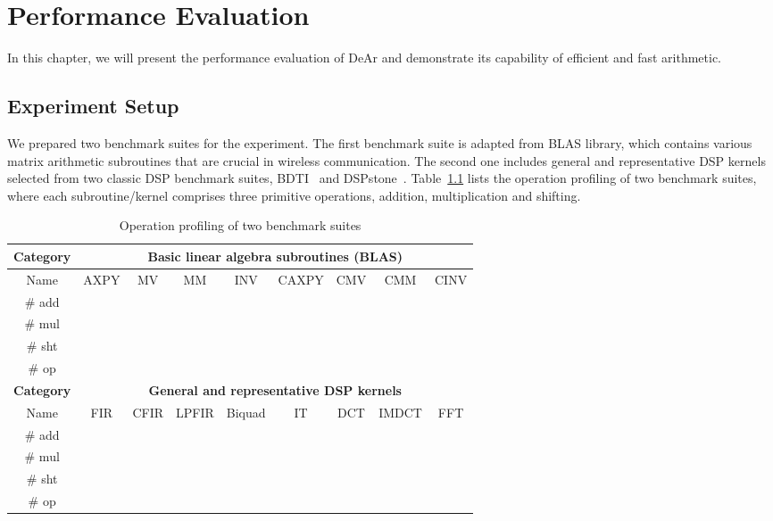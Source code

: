 \chapter{Performance Evaluation}
In this chapter, we will present the performance evaluation of DeAr and demonstrate its capability of efficient and fast arithmetic.
\section{Experiment Setup}
\label{sec:evaluation:setup}
We prepared two benchmark suites for the experiment.
The first benchmark suite is adapted from BLAS library, 
which contains various matrix arithmetic subroutines that are crucial in wireless communication.
The second one includes general and representative DSP kernels selected from two classic DSP benchmark suites, BDTI~\cite{btdi} and DSPstone~\cite{dspstone}.
Table~\ref{tab:op} lists the operation profiling of two benchmark suites, 
where each subroutine/kernel comprises three primitive operations, addition, multiplication and shifting.
\begin{table}[!ht]
    \centering
    \caption{Operation profiling of two benchmark suites}
    \label{tab:op}
    \begin{tabular}{|c|c|c|c|c|c|c|c|c|}
        \hline
        \textbf{Category} & \multicolumn{8}{c|}{\textbf{Basic linear algebra subroutines (BLAS)}} \\ \hline
        Name              & AXPY   & MV     & MM      & INV      & CAXPY  & CMV  & CMM    & CINV  \\ \hline
        \# add            &        &        &         &          &        &      &        &       \\ \hline
        \# mul            &        &        &         &          &        &      &        &       \\ \hline
        \# sht            &        &        &         &          &        &      &        &       \\ \hline
        \# op             &        &        &         &          &        &      &        &       \\ \hline
        \textbf{Category} & \multicolumn{8}{c|}{\textbf{General and representative DSP kernels}}                     \\ \hline
        Name              & FIR    & CFIR   & LPFIR   & Biquad   & IT     & DCT  & IMDCT  & FFT   \\ \hline
        \# add            &        &        &         &          &        &      &        &       \\ \hline
        \# mul            &        &        &         &          &        &      &        &       \\ \hline
        \# sht            &        &        &         &          &        &      &        &       \\ \hline
        \# op             &        &        &         &          &        &      &        &       \\ \hline
    \end{tabular}
\end{table}
